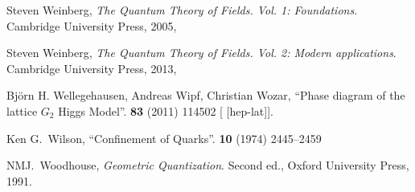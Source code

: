 \begin{thebibliography}{99}
Steven Weinberg,
\textit{The Quantum Theory of Fields. Vol. 1: Foundations}.
Cambridge University Press, 2005,
{\tt{}}

Steven Weinberg,
\textit{The Quantum Theory of Fields. Vol. 2: Modern applications}.
Cambridge University Press, 2013,
{\tt{}}

Bj\"{o}rn H. Wellegehausen, Andreas Wipf, Christian Wozar,
``Phase diagram of the lattice $G_2$ Higgs Model''.
 \textbf{83} (2011) 114502
{\tt{}}
[ [hep-lat]].

Ken G.~Wilson,
``Confinement of Quarks''.
 \textbf{10} (1974) 2445--2459
{\tt{}}

NMJ.~Woodhouse,
\textit{Geometric Quantization}.
Second ed., Oxford University Press, 1991.

\end{thebibliography}

